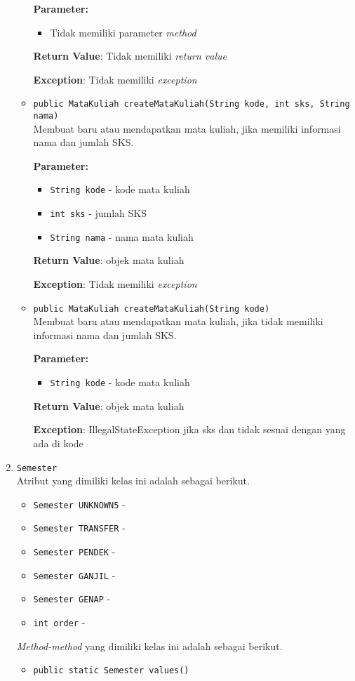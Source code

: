 \documentclass{article}
\begin{document}
\begin{enumerate}
\begin{itemize}
\textbf{Parameter:}\begin{itemize}
\item Tidak memiliki parameter \textit{method}
\end{itemize}
\textbf{Return Value}: Tidak memiliki \textit{return value}

\textbf{Exception}: Tidak memiliki \textit{exception}

\item \texttt{public MataKuliah createMataKuliah(String kode, int sks, String nama)}\\ 
Membuat baru atau mendapatkan mata kuliah, jika memiliki informasi
 nama dan jumlah SKS.

\textbf{Parameter:}
\begin{itemize}
\item \texttt{String kode} - 
kode mata kuliah
\item \texttt{int sks} - 
jumlah SKS
\item \texttt{String nama} - 
nama mata kuliah
\end{itemize}
\textbf{Return Value}: objek mata kuliah

\textbf{Exception}: Tidak memiliki \textit{exception}

\item \texttt{public MataKuliah createMataKuliah(String kode)}\\ 
Membuat baru atau mendapatkan mata kuliah, jika tidak memiliki informasi
 nama dan jumlah SKS.

\textbf{Parameter:}
\begin{itemize}
\item \texttt{String kode} - 
kode mata kuliah
\end{itemize}
\textbf{Return Value}: objek mata kuliah

\textbf{Exception}: IllegalStateException
             jika sks dan tidak sesuai dengan yang ada di kode

\end{itemize}
\item \texttt{Semester}\\ 


Atribut yang dimiliki kelas ini adalah sebagai berikut.
\begin{itemize}
\item \texttt{Semester UNKNOWN5} - 
\item \texttt{Semester TRANSFER} - 
\item \texttt{Semester PENDEK} - 
\item \texttt{Semester GANJIL} - 
\item \texttt{Semester GENAP} - 
\item \texttt{int order} - 
\end{itemize}
\textit{Method-method} yang dimiliki kelas ini adalah sebagai berikut.
\begin{itemize}
\item \texttt{public static Semester values()}\\ 



\end{itemize}
\end{enumerate}
\end{document}
